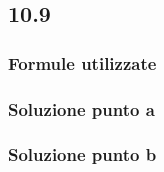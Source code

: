 \documentclass[../../main.tex]{subfiles}
\begin{document}
\subsection*{10.9}
\subsubsection*{Formule utilizzate}
\subsubsection*{Soluzione punto a}
\subsubsection*{Soluzione punto b}
\newpage
\end{document}
